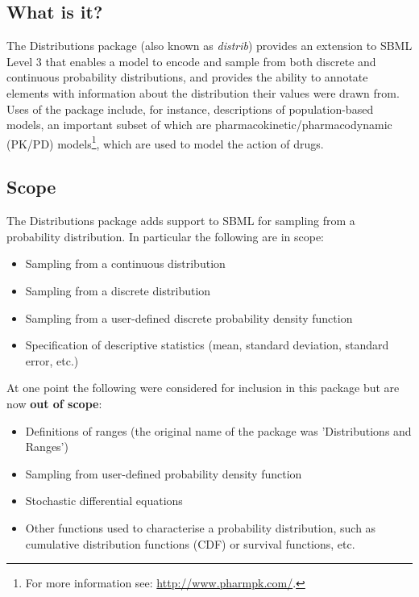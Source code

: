 \documentclass[draftspec]{sbmlpkgspec}
\newcommand{\distribshort}{\emph{distrib}\xspace}
\newcommand{\distrib}{Distributions\xspace}
\begin{document}
\subsection{What is it?}

The \distrib package (also known as \distribshort) provides an extension to SBML Level 3 that enables a model to encode and sample from
both discrete and continuous probability distributions, and provides
the ability to annotate elements with information about the distribution their
values were drawn from. 
Uses of the package include, for instance, descriptions of
population-based models, an important subset of which are
pharmacokinetic/pharmacodynamic (PK/PD) models\footnote{For more
  information see: \url{http://www.pharmpk.com/}.}, which are used to
model the action of drugs.

\subsection{Scope}

The \distrib package adds support to SBML for sampling from a
probability distribution. In particular the following are in scope:

\begin{itemize}
\item Sampling from a continuous distribution
\item Sampling from a discrete distribution
\item Sampling from a user-defined discrete probability density function
\item Specification of descriptive statistics (mean, standard
  deviation, standard error, etc.)
\end{itemize}

At one point the following were considered for inclusion in this
package but are now \textbf{out of scope}:

\begin{itemize}
\item Definitions of ranges (the original name of the package was 'Distributions and Ranges')
\item Sampling from user-defined probability density function
\item Stochastic differential equations
\item Other functions used to characterise a probability distribution,
  such as cumulative distribution functions (CDF) or survival functions, etc.
\end{itemize}
\end{document}
